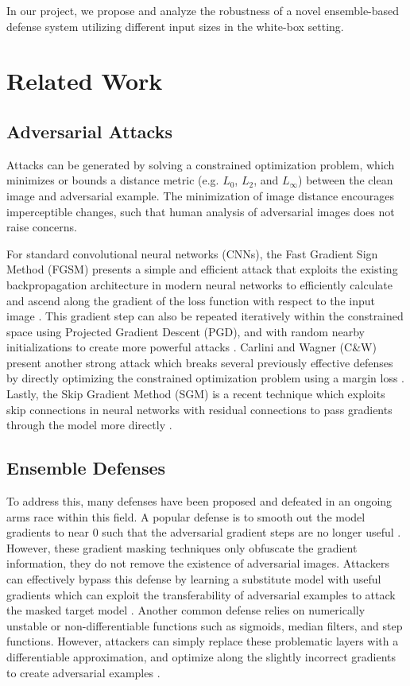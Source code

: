 \documentclass[10pt,journal,compsoc]{IEEEtran}
\begin{document}
In our project, we propose and analyze the robustness of a novel ensemble-based defense system utilizing different input sizes in the white-box setting. 


\section{Related Work} %
\subsection{Adversarial Attacks}

Attacks can be generated by solving a constrained optimization problem, which minimizes or bounds a distance metric (e.g. $L_0$, $L_2$, and $L_\infty$) between the clean image and adversarial example. The minimization of image distance encourages imperceptible changes, such that human analysis of adversarial images does not raise concerns.

For standard convolutional neural networks (CNNs), the Fast Gradient Sign Method (FGSM) presents a simple and efficient attack that exploits the existing backpropagation architecture in modern neural networks to efficiently calculate and ascend along the gradient of the loss function with respect to the input image \cite{fgsm}. This gradient step can also be repeated iteratively within the constrained space using Projected Gradient Descent (PGD), and with random nearby initializations to create more powerful attacks \cite{pgd}. Carlini and Wagner (C\&W) present another strong attack which breaks several previously effective defenses by directly optimizing the constrained optimization problem using a margin loss \cite{cw}. Lastly, the Skip Gradient Method (SGM) is a recent technique which exploits skip connections in neural networks with residual connections to pass gradients through the model more directly \cite{sgm}.

\subsection{Ensemble Defenses}
To address this, many defenses have been proposed and defeated in an ongoing arms race within this field. A popular defense is to smooth out the model gradients to near 0 such that the adversarial gradient steps are no longer useful \cite{lbfgs} \cite{dd}. However, these gradient masking techniques only obfuscate the gradient information, they do not remove the existence of adversarial images. Attackers can effectively bypass this defense by learning a substitute model with useful gradients which can exploit the transferability of adversarial examples to attack the masked target model \cite{pbba}. Another common defense relies on numerically unstable or non-differentiable functions such as sigmoids, median filters, and step functions. However, attackers can simply replace these problematic layers with a differentiable approximation, and optimize along the slightly incorrect gradients to create adversarial examples \cite{bpda}. 
\end{document}
